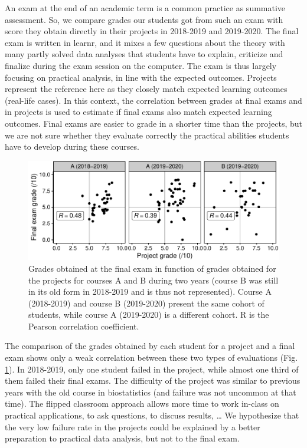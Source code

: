\documentclass{aims}
\theoremstyle{definition}
\begin{document}
An exam at the end of an academic term is a common practice as summative
assessment. So, we compare grades our students got from such an exam
with score they obtain directly in their projects in 2018-2019 and
2019-2020. The final exam is written in learnr, and it mixes a few
questions about the theory with many partly solved data analyses that
students have to explain, criticize and finalize during the exam session
on the computer. The exam is thus largely focusing on practical
analysis, in line with the expected outcomes. Projects represent the
reference here as they closely match expected learning outcomes
(real-life cases). In this context, the correlation between grades at
final exams and in projects is used to estimate if final exams also
match expected learning outcomes. Final exams are easier to grade in a
shorter time than the projects, but we are not sure whether they
evaluate correctly the practical abilities students have to develop
during these courses.

\begin{figure}
\includegraphics[width=1\linewidth]{teaching_data_science_files/figure-latex/fig_exams_projects-1} \caption{\label{fig:fig_exams_projects}  Grades obtained at the final exam in function of grades obtained for the projects for courses A and B during two years (course B was still in its old form in 2018-2019 and is thus not represented). Course A (2018-2019) and course B (2019-2020) present the same cohort of students, while course A (2019-2020) is a different cohort. R is the Pearson correlation coefficient.}\label{fig:fig_exams_projects}
\end{figure}

The comparison of the grades obtained by each student for a project and
a final exam shows only a weak correlation between these two types of
evaluations (Fig. \ref {fig:fig_exams_projects}). In 2018-2019, only one
student failed in the project, while almost one third of them failed
their final exams. The difficulty of the project was similar to previous
years with the old course in biostatistics (and failure was not uncommon
at that time). The flipped classroom approach allows more time to work
in-class on practical applications, to ask questions, to discuss
results, \ldots{} We hypothesize that the very low failure rate in the
projects could be explained by a better preparation to practical data
analysis, but not to the final exam.
\end{document}
